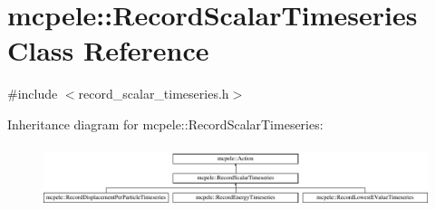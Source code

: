 \hypertarget{classmcpele_1_1RecordScalarTimeseries}{\section{mcpele\-:\-:\-Record\-Scalar\-Timeseries \-Class \-Reference}
\label{classmcpele_1_1RecordScalarTimeseries}
}


{\ttfamily \#include $<$record\-\_\-scalar\-\_\-timeseries.\-h$>$}

\-Inheritance diagram for mcpele\-:\-:\-Record\-Scalar\-Timeseries\-:\begin{figure}[H]
\begin{center}
\leavevmode
\includegraphics[height=1.836066cm]{classmcpele_1_1RecordScalarTimeseries}
\end{center}
\end{figure}
